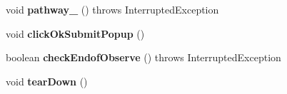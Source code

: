 \begin{DoxyCompactItemize}
void {\bfseries pathway\+\_} ()  throws Interrupted\+Exception 	
\item 
\hypertarget{classcom_1_1zeuslearning_1_1automation_1_1unittests_1_1Cengage__4844_a6e41c5f43e244b48b6489f8b0b0ad6f9}{}\label{classcom_1_1zeuslearning_1_1automation_1_1unittests_1_1Cengage__4844_a6e41c5f43e244b48b6489f8b0b0ad6f9} 
void {\bfseries click\+Ok\+Submit\+Popup} ()
\item 
\hypertarget{classcom_1_1zeuslearning_1_1automation_1_1unittests_1_1Cengage__4844_ad3f19a8300bacaa65aa6f19aacdf658c}{}\label{classcom_1_1zeuslearning_1_1automation_1_1unittests_1_1Cengage__4844_ad3f19a8300bacaa65aa6f19aacdf658c} 
boolean {\bfseries check\+Endof\+Observe} ()  throws Interrupted\+Exception 	
\item 
\hypertarget{classcom_1_1zeuslearning_1_1automation_1_1unittests_1_1Cengage__4844_a64608d1cccb8049587b22662cbed66d5}{}\label{classcom_1_1zeuslearning_1_1automation_1_1unittests_1_1Cengage__4844_a64608d1cccb8049587b22662cbed66d5} 
void {\bfseries tear\+Down} ()
\end{DoxyCompactItemize}
